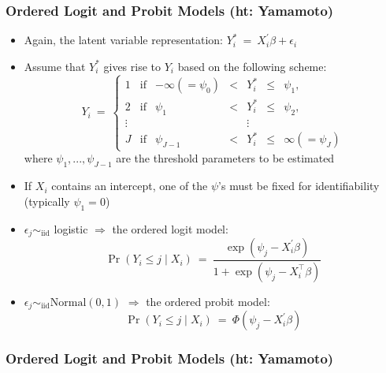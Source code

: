 \documentclass{beamer}
\begin{document}
\begin{frame}
\frametitle{Ordered Logit and Probit Models  (ht: Yamamoto)}
\begin{itemize}
    \item Again, the \alert{latent variable} representation: 
        $ Y_i^\ast \ = \ X_i^{'} \beta + \epsilon_{i} $
\pause
    \item Assume that $Y_i^\ast$ gives rise to $Y_i$ based on the following scheme:
    {\small
        $$Y_i \ = \ \left\{\begin{array}{ccccccc} 
      1 & \text{if} & -\infty (= \psi_0)  & < & Y_i^\ast & \le & \psi_1, \\
      2 & \text{if} & \psi_1 & < & Y_i^\ast & \le & \psi_2, \\
      \vdots & & & & \vdots & & \\
      J & \text{if} & \psi_{J-1} & < & Y_i^\ast & \le & \infty (= \psi_J) 
        \end{array}\right. $$
    }
where $\psi_1, ..., \psi_{J-1}$ are the \alert{threshold parameters} to be estimated
\pause
    \item If $X_i$ contains an intercept, one of the $\psi$'s must be fixed for identifiability
    (typically $\psi_1 = 0$)
\medskip
\pause
    \item $\epsilon_{j} \sim_{\text{iid}}$ logistic $\Rightarrow$ the \alert{ordered logit} model:
    {\small
        $$ \Pr(Y_i \leq j \mid X_i) \ = \ \frac{\exp(\psi_j - X_i^{'}\beta)}
            {1 + \exp(\psi_j - X_i^\top\beta)} $$
    }
    \item $\epsilon_{j} \sim_{\text{iid}} \text{Normal}(0,1)$ $\Rightarrow$ the \alert{ordered probit} model:
    {\small
        $$ \Pr(Y_i \leq j \mid X_i) \ = \ \Phi\left(\psi_j - X_i^{'}\beta\right) $$
    }
\end{itemize}
\end{frame}

\begin{frame}
\frametitle{Ordered Logit and Probit Models (ht: Yamamoto)}
\begin{center}
%
%
%
\end{center}
\end{frame}
\end{document}

